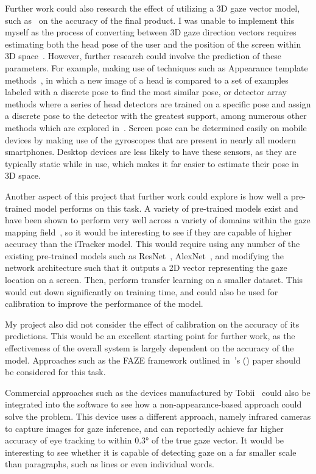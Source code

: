\documentclass{report}
\newcommand\posscite[1]{\citeauthor{#1}'s (\citeyear{#1}) \cite{#1}}
\begin{document}
Further work could also research the effect of utilizing a 3D gaze vector model, such as~\cite{zaho2024gazeswin,yu2019deep} on the accuracy of the final product. I was unable to implement this myself as the process of converting between 3D gaze direction vectors requires estimating both the head pose of the user and the position of the screen within 3D space~\cite{zhang15cvpr}. However, further research could involve the prediction of these parameters. For example, making use of techniques such as Appearance template methods~\cite{niyogi1996example}, in which a new image of a head is compared to a set of examples labeled with a discrete pose to find the most similar pose, or detector array methods where a series of head detectors are trained on a specific pose and assign a discrete pose to the detector with the greatest support, among numerous other methods which are explored in~\cite{chutorian2009head}. Screen pose can be determined easily on mobile devices by making use of the gyroscopes that are present in nearly all modern smartphones. Desktop devices are less likely to have these sensors, as they are typically static while in use, which makes it far easier to estimate their pose in 3D space.

Another aspect of this project that further work could explore is how well a pre-trained model performs on this task. A variety of pre-trained models exist and have been shown to perform very well across a variety of domains within the gaze mapping field~\cite{akinyelu2020convolutional}, so it would be interesting to see if they are capable of higher accuracy than the iTracker model. This would require using any number of the existing pre-trained models such as ResNet~\cite{he2015deep}, AlexNet~\cite{krizhevsky2017imagenet}, and modifying the network architecture such that it outputs a 2D vector representing the gaze location on a screen. Then, perform transfer learning on a smaller dataset. This would cut down significantly on training time, and could also be used for calibration to improve the performance of the model. 

My project also did not consider the effect of calibration on the accuracy of its predictions. This would be an excellent starting point for further work, as the effectiveness of the overall system is largely dependent on the accuracy of the model. Approaches such as the FAZE framework outlined in~\posscite{seonwook2019fewshot} paper should be considered for this task.


Commercial approaches such as the devices manufactured by Tobii~\cite{tobiiprofusion} could also be integrated into the software to see how a non-appearance-based approach could solve the problem. This device uses a different approach, namely infrared cameras to capture images for gaze inference, and can reportedly achieve far higher accuracy of eye tracking to within \(\ang{0.3}\) of the true gaze vector. It would be interesting to see whether it is capable of detecting gaze on a far smaller scale than paragraphs, such as lines or even individual words. 
\end{document}
